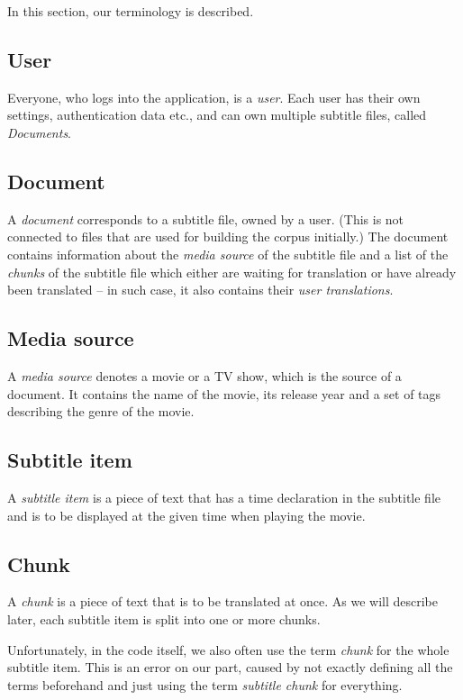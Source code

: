 \label{sec:glossary}

In this section, our terminology is described.

\subsection*{User}
Everyone, who logs into the application, is a \emph{user}. Each user has their own settings, authentication data etc., and can own multiple subtitle files, called \emph{Documents}.

\subsection*{Document}
A \emph{document} corresponds to a subtitle file, owned by a user. (This is not connected to files that are used for building the corpus initially.) The document contains information about the \emph{media source} of the subtitle file and a list of the \emph{chunks} of the subtitle file which either are waiting for translation or have already been translated -- in such case, it also contains their \emph{user translations}.

\subsection*{Media source}
A \emph{media source} denotes a movie or a TV show, which is the source of a document. It contains the name of the movie, its release year and a set of tags describing the genre of the movie.

\subsection*{Subtitle item}
A \emph{subtitle item} is a piece of text that has a time declaration in the subtitle file and is to be displayed at the given time when playing the movie.

\subsection*{Chunk}
A \emph{chunk} is a piece of text that is to be translated at once. As we will describe later, each subtitle item is split into one or more chunks.

Unfortunately, in the code itself, we also often use the term \emph{chunk} for the whole subtitle item. This is an error on our part, caused by not exactly defining all the terms beforehand and just using the term \emph{subtitle chunk} for everything.

